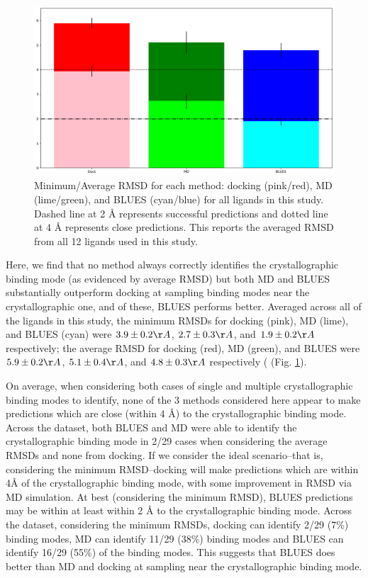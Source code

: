 \begin{figure}
    \centering
    \includegraphics[width=\linewidth]{chapter6/Figures/averages.png}
    \caption[Average RMSD]{Minimum/Average RMSD for each method: docking (pink/red), MD (lime/green), and BLUES (cyan/blue) for all ligands in this study. Dashed line at 2 {\AA} represents successful predictions and dotted line at 4 {\AA} represents close predictions. This reports the averaged RMSD from all 12 ligands used in this study.}
    \label{fig:averages}
\end{figure}
Here, we find that no method always correctly identifies the crystallographic binding mode (as evidenced by average RMSD) but both MD and BLUES substantially outperform docking at sampling binding modes near the crystallographic one, and of these, BLUES performs better.
Averaged across all of the ligands in this study,  the minimum RMSDs for docking (pink), MD (lime), and BLUES (cyan) were $3.9 \pm 0.2 {\AA}$, $2.7 \pm 0.3 {\AA}$, and $1.9 \pm 0.2 {\AA}$ respectively; the average RMSD for docking (red), MD (green), and BLUES were $5.9 \pm 0.2 {\AA}$, $5.1 \pm 0.4 {\AA}$, and $4.8 \pm 0.3 {\AA}$ respectively ( (Fig. \ref{fig:averages}).

On average, when considering both cases of single and multiple crystallographic binding modes to identify, none of the 3 methods considered here appear to make predictions which are close (within 4 {\AA}) to the crystallographic binding mode.
Across the dataset, both BLUES and MD were able to identify the crystallographic binding mode in 2/29 cases when considering the average RMSDs and none from docking.
If we consider the ideal scenario--that is, considering the minimum RMSD--docking will make predictions which are within 4{\AA} of the crystallographic binding mode, with some improvement in RMSD via MD simulation.
At best (considering the minimum RMSD), BLUES predictions may be within at least within 2 {\AA} to the crystallographic binding mode.
Across the dataset, considering the minimum RMSDs, docking can identify 2/29 (7\%) binding modes, MD can identify 11/29 (38\%) binding modes and BLUES can identify 16/29 (55\%) of the binding modes.
This suggests that BLUES does better than MD and docking at sampling near the crystallographic binding mode.

